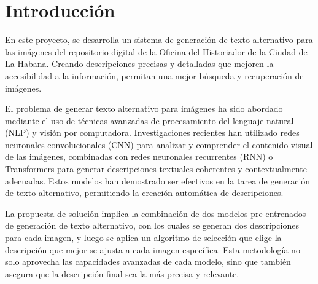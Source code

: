 \chapter{Introducción}\label{chapter:introduction}
En este proyecto, se desarrolla un sistema de generación de texto alternativo para las imágenes del repositorio digital de la Oficina del Historiador de la Ciudad de La Habana. Creando descripciones precisas y detalladas que mejoren la accesibilidad a la información, permitan una mejor búsqueda y recuperación de imágenes. 

El problema de generar texto alternativo para imágenes ha sido abordado mediante el uso de técnicas avanzadas de procesamiento del lenguaje natural (NLP) y visión por computadora. Investigaciones recientes han utilizado redes neuronales convolucionales (CNN) para analizar y comprender el contenido visual de las imágenes, combinadas con redes neuronales recurrentes (RNN) o Transformers para generar descripciones textuales coherentes y contextualmente adecuadas. Estos modelos han demostrado ser efectivos en la tarea de generación de texto alternativo, permitiendo la creación automática de descripciones.

La propuesta de solución implica la combinación de dos modelos pre-entrenados de generación de texto alternativo, con los cuales se generan dos descripciones para cada imagen, y luego se aplica un algoritmo de selección que elige la descripción que mejor se ajusta a cada imagen específica. Esta metodología no solo aprovecha las capacidades avanzadas de cada modelo, sino que también asegura que la descripción final sea la más precisa y relevante.